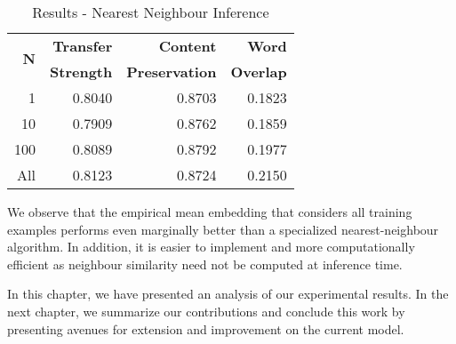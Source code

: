 \begin{table}[ht]
	\centering
	\begin{tabular}{| r | r | r | r |}
		\hline
		\multirow{2}{*}{
		\textbf{$\bm N$}} & \textbf{Transfer} & \textbf{Content}      & \textbf{Word}    \\
		            & \textbf{Strength} & \textbf{Preservation} & \textbf{Overlap} \\
		\hline
		\hline
		1           & 0.8040            & 0.8703                & 0.1823           \\
		\hline
		10          & 0.7909            & 0.8762                & 0.1859           \\
		\hline
		100         & 0.8089            & 0.8792                & 0.1977           \\
		\hline
		All         & 0.8123            & 0.8724                & 0.2150           \\
		\hline
	\end{tabular}
	\caption{Results - Nearest Neighbour Inference}
	\label{tab:nearest-neighbour-inference-results}
\end{table}

We observe that the empirical mean embedding that considers all training examples performs even marginally better than a specialized nearest-neighbour algorithm. In addition, it is easier to implement and more computationally efficient as neighbour similarity need not be computed at inference time.


In this chapter, we have presented an analysis of our experimental results. In the next chapter, we summarize our contributions and conclude this work by presenting avenues for extension and improvement on the current model.
